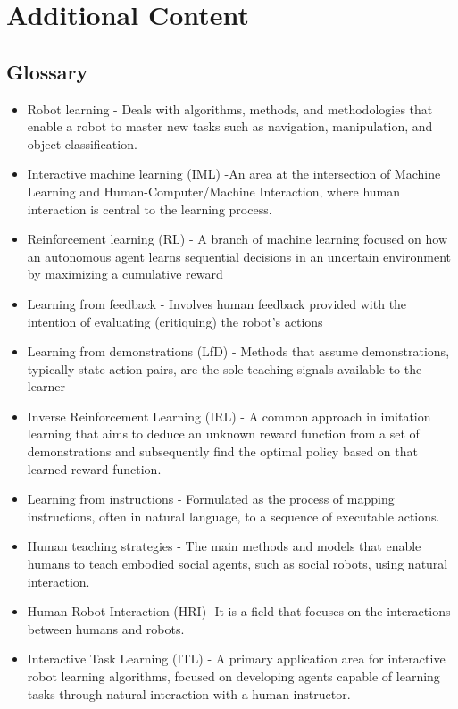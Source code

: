 \documentclass[report.tex]{subfiles}
\begin{document}
    \chapter{Additional Content}

        \section{Glossary}
        \begin{itemize}
                
                \item  Robot learning - Deals with algorithms, methods, and methodologies that enable a robot to master new tasks such as navigation, manipulation, and object classification.
                \item Interactive machine learning (IML)  -An area at the intersection of Machine Learning and Human-Computer/Machine Interaction, where human interaction is central to the learning process.
                \item Reinforcement learning (RL) - A branch of machine learning focused on how an autonomous agent learns sequential decisions in an uncertain environment by maximizing a cumulative reward
                \item Learning from feedback - Involves human feedback provided with the intention of evaluating (critiquing) the robot's actions
                \item Learning from demonstrations (LfD) - Methods that assume demonstrations, typically state-action pairs, are the sole teaching signals available to the learner
                \item Inverse Reinforcement Learning (IRL) - A common approach in imitation learning that aims to deduce an unknown reward function from a set of demonstrations and subsequently find the optimal policy based on that learned reward function.
                \item Learning from instructions -  Formulated as the process of mapping instructions, often in natural language, to a sequence of executable actions.
                \item Human teaching strategies - The main methods and models that enable humans to teach embodied social agents, such as social robots, using natural interaction. 
                \item Human Robot Interaction (HRI) -It is a field that focuses on the interactions between humans and robots.
                \item Interactive Task Learning (ITL) -  A primary application area for interactive robot learning algorithms, focused on developing agents capable of learning tasks through natural interaction with a human instructor. 

\end{itemize}
\end{document}
